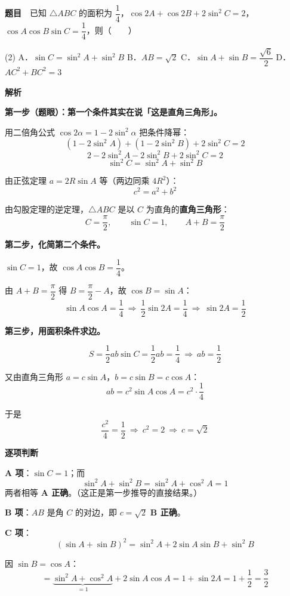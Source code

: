 \par\medskip


\textbf{题目}　已知 $\triangle ABC$ 的面积为 $\dfrac14$，$\cos2A+\cos2B+2\sin^2C=2$，$\cos A\cos B\sin C=\dfrac14$，则（　　）

\begin{gkopts}(2)
\task A．$\sin C=\sin^2A+\sin^2B$
\task B．$AB=\sqrt2$
\task C．$\sin A+\sin B=\dfrac{\sqrt6}{2}$
\task D．$AC^2+BC^2=3$
\end{gkopts}

\textbf{解析}

\textbf{第一步（题眼）：第一个条件其实在说「这是直角三角形」。}

用二倍角公式 $\cos2\alpha=1-2\sin^2\alpha$ 把条件降幂：
\[\left(1-2\sin^2A\right)+\left(1-2\sin^2B\right)+2\sin^2C=2\]
\[2-2\sin^2A-2\sin^2B+2\sin^2C=2\]
\[\sin^2C=\sin^2A+\sin^2B\]

由正弦定理 $a=2R\sin A$ 等（两边同乘 $4R^2$）：
\[c^2=a^2+b^2\]

由勾股定理的逆定理，$\triangle ABC$ 是以 $C$ 为直角的\textbf{直角三角形}：
\[C=\frac\pi2,\qquad \sin C=1,\qquad A+B=\frac\pi2\]

\textbf{第二步，化简第二个条件。}

$\sin C=1$，故 $\cos A\cos B=\dfrac14$。

由 $A+B=\dfrac\pi2$ 得 $B=\dfrac\pi2-A$，故 $\cos B=\sin A$：
\[\sin A\cos A=\frac14\ \Longrightarrow\ \frac12\sin2A=\frac14\ \Longrightarrow\ \sin2A=\frac12\]

\textbf{第三步，用面积条件求边。}

\[S=\frac12ab\sin C=\frac12ab=\frac14\ \Longrightarrow\ ab=\frac12\]

又由直角三角形 $a=c\sin A$，$b=c\sin B=c\cos A$：
\[ab=c^2\sin A\cos A=c^2\cdot\frac14\]

于是
\[\frac{c^2}{4}=\frac12\ \Longrightarrow\ c^2=2\ \Longrightarrow\ c=\sqrt2\]

\par\medskip

\textbf{逐项判断}

\textbf{A 项}：$\sin C=1$；而
\[\sin^2A+\sin^2B=\sin^2A+\cos^2A=1\]
两者相等  \textbf{A 正确}。（这正是第一步推导的直接结果。）

\textbf{B 项}：$AB$ 是角 $C$ 的对边，即 $c=\sqrt2$  \textbf{B 正确}。

\textbf{C 项}：
\[(\sin A+\sin B)^2=\sin^2A+2\sin A\sin B+\sin^2B\]

因 $\sin B=\cos A$：
\[=\underbrace{\sin^2A+\cos^2A}_{=1}+2\sin A\cos A=1+\sin2A=1+\frac12=\frac32\]

